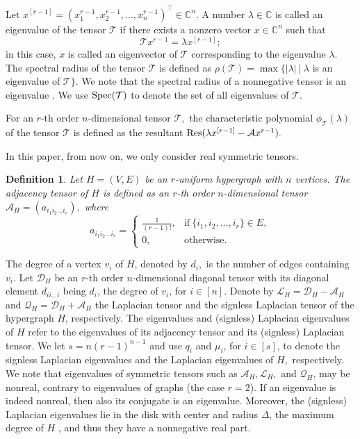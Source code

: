 \documentclass[11pt]{article}
\newtheorem{definition}[theorem]{Definition}
\def\Res{\mathop{\rm Res }\nolimits}
\def\Spec{\mathop{\rm Spec }\nolimits}
\begin{document}
Let $x^{[r-1]}=(x_{1}^{r-1}, x_{2}^{r-1}, \ldots, x_{n}^{r-1})^{\top}\in \mathbb{C}^{n}$. A number $\lambda\in \mathbb{C}$ is called an eigenvalue of the tensor $\mathcal{T}$ if there exists a nonzero vector $x\in \mathbb{C}^{n}$ such that $$\mathcal{T} x^{r-1}=\lambda x^{[r-1]};$$ in this case, $x$ is called an eigenvector of $\mathcal{T}$ corresponding to the eigenvalue $\lambda.$ The spectral radius of the tensor $\mathcal{T}$ is defined as $\rho(\mathcal{T})=\max\{|\lambda|~|~\lambda$ is an eigenvalue of $\mathcal{T}\}$. We note that the spectral radius of a nonnegative tensor is an eigenvalue \cite{Qi2}. We use $\Spec(\mathcal{T})$ to denote the set of all eigenvalues of $\mathcal{T}.$

For an $r$-th order $n$-dimensional tensor $\mathcal{T},$ the characteristic polynomial $\phi_{\mathcal{T}}(\lambda)$ of the tensor $\mathcal{T}$ is defined as the resultant $\Res(\lambda x^{[r-1]}-\mathcal{A} x^{r-1}).$

In this paper, from now on, we only consider real symmetric tensors.


\noindent\begin{definition}\label{de:c1} \cite{CoDu}
Let $H = (V, E)$ be an $r$-uniform hypergraph with $n$ vertices. The adjacency tensor of $H$ is defined as an $r$-th order $n$-dimensional tensor $\mathcal{A}_{H}=(a_{i_{1}i_{2}\ldots i_{r}}),$ where $$a_{i_{1}i_{2}\ldots i_{r}}=\left\{
\begin{array}{ll}
\frac{1}{(r-1)!},& \mbox {if}   ~\{i_{1},i_{2},\ldots, i_{r}\} \in E,
\\
0,& \mbox {otherwise}.
\end{array}
\right.$$
\end{definition}

The degree of a vertex $v_{i}$ of $H$, denoted by $d_{i},$ is the number of edges containing $v_{i}.$ Let $\mathcal{D}_{H}$ be an $r$-th order $n$-dimensional diagonal tensor with its diagonal element $d_{ii\ldots i}$ being $d_{i}$, the degree of $v_{i}$, for $i\in [n].$ Denote by $\mathcal{L}_{H}=\mathcal{D}_{H}-\mathcal{A}_{H}$ and $\mathcal{Q}_{H}=\mathcal{D}_{H}+\mathcal{A}_{H}$ the Laplacian tensor and the signless Laplacian tensor of the hypergraph $H$, respectively. The eigenvalues and (signless) Laplacian eigenvalues of $H$ refer to the eigenvalues of its adjacency tensor and its (signless) Laplacian tensor. We let $s=n(r-1)^{n-1}$ and use $q_{i}$ and $\mu_{i}$, for $i\in [s]$, to denote the signless Laplacian eigenvalues and the Laplacian eigenvalues of $H,$ respectively. We note that eigenvalues of symmetric tensors such as $\mathcal{A}_{H}, \mathcal{L}_{H},$ and $\mathcal{Q}_{H}$, may be nonreal, contrary to eigenvalues of graphs (the case $r=2$). If an eigenvalue is indeed nonreal, then also its conjugate is an eigenvalue. Moreover, the (signless) Laplacian eigenvalues lie in the disk with center and radius $\Delta$, the maximum degree of $H$ \cite{Qi2}, and thus they have a nonnegative real part.
\end{document}
